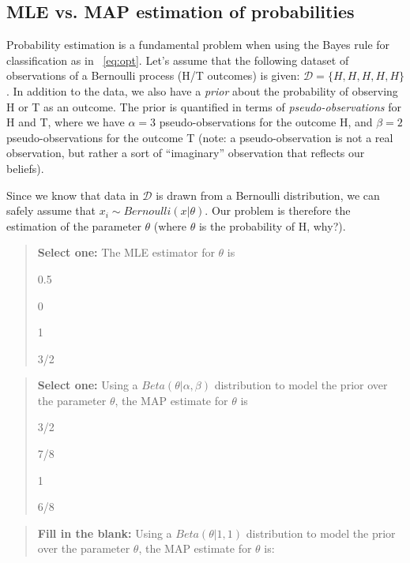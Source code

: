 \pagebreak
\subsection{MLE vs. MAP estimation of probabilities }
Probability estimation is a fundamental problem when using the Bayes rule for classification as in
~\eqref{eq:opt}. Let's assume that the following dataset of observations of a Bernoulli process (H/T
outcomes) is given: $\mathcal{D} = \{H,H,H,H,H\}$. In addition to the data, we also have a {\em prior}
about the probability of observing H or T as an outcome. The prior is quantified in terms of {\em
  pseudo-observations} for H and T, where we have $\alpha = 3$ pseudo-observations for the outcome
H, and $\beta = 2$ pseudo-observations for the outcome T (note: a pseudo-observation is not a real
observation, but rather a  sort of ``imaginary'' observation that reflects our beliefs).

Since we know that data in $\mathcal{D}$ is drawn from a Bernoulli distribution, we can safely assume that $x_i \sim Bernoulli(x | \theta)$. Our problem is therefore the estimation of the
parameter $\theta$ (where $\theta$ is the probability of H, why?).

\begin{quote}
\textbf{Select one:} The MLE estimator for $\theta$ is
\begin{list}{}
     \item\Circle{} 0.5
     \item\Circle{} 0
     \item\Circle{} 1
     \item\Circle{} 3/2
\end{list}
\end{quote}


\begin{quote}
\textbf{Select one:} Using a $Beta(\theta | \alpha, \beta)$ distribution to model the prior over the
parameter $\theta$, the MAP estimate for $\theta$ is
\begin{list}{}
     \item\Circle{} 3/2
     \item\circle{} 7/8
     \item\circle{} 1
     \item\Circle{} 6/8
\end{list}
\end{quote}


\begin{quote}
 \textbf{Fill in the blank:} Using a $Beta(\theta | 1, 1)$ distribution to model the prior over the
parameter $\theta$, the MAP estimate for $\theta$ is:

\begin{tcolorbox}[fit,height=2cm, width=4cm, blank, borderline={1pt}{-2pt},nobeforeafter]
    \begin{center} \end{center}
    \end{tcolorbox}\hspace{2cm}
\end{quote}

